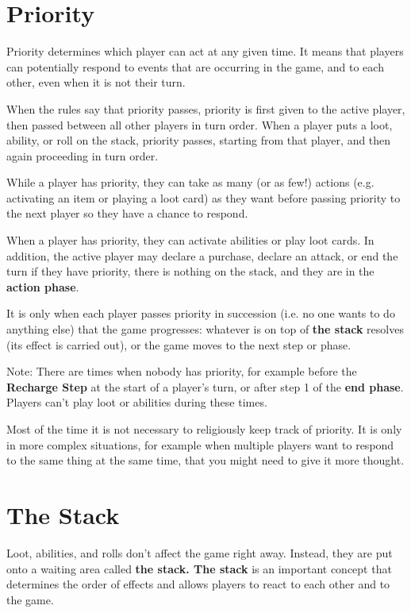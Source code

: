 \documentclass[a4paper, twoside]{report} %
\begin{document}
    \chapter{Priority}
    \label{priority}
    Priority determines which player can act at any given time. It means that players can potentially respond to events that are occurring in the game, and to each other, even when it is not their turn.

    When the rules say that priority passes, priority is first given to the active player, then passed between all other players in turn order. When a player puts a loot, ability, or roll on the stack, priority passes, starting from that player, and then again proceeding in turn order.

    While a player has priority, they can take as many (or as few!) actions (e.g. activating an item or playing a loot card) as they want before passing priority to the next player so they have a chance to respond.

    When a player has priority, they can activate abilities or play loot cards. In addition, the active player may declare a purchase, declare an attack, or end the turn if they have priority, there is nothing on the stack, and they are in the \textbf{action phase}.

    It is only when each player passes priority in succession (i.e. no one wants to do anything else) that the game progresses: whatever is on top of \textbf{the stack} resolves (its effect is carried out), or the game moves to the next step or phase.

    Note: There are times when nobody has priority, for example before the \textbf{Recharge Step} at the start of a player’s turn, or after step 1 of the \textbf{end phase}. Players can’t play loot or abilities during these times.

    Most of the time it is not necessary to religiously keep track of priority. It is only in more complex situations, for example when multiple players want to respond to the same thing at the same time, that you might need to give it more thought.

    \chapter{The Stack}
    \label{stack}
    Loot, abilities, and rolls don’t affect the game right away. Instead, they are put onto a waiting area called \textbf{the stack. The stack} is an important concept that determines the order of effects and allows players to react to each other and to the game.
\end{document}
